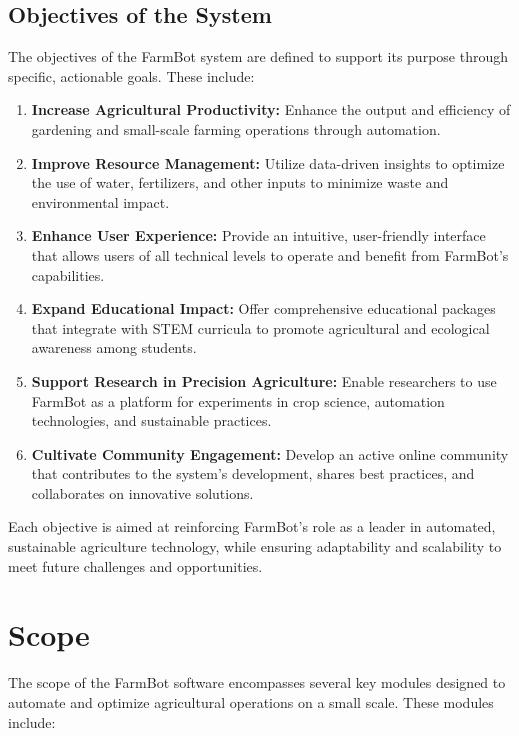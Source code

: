 \subsection{Objectives of the System}
The objectives of the FarmBot system are defined to support its purpose through specific, actionable goals. These include:
\begin{enumerate}
    \item \textbf{Increase Agricultural Productivity:} Enhance the output and efficiency of gardening and small-scale farming operations through automation.
    \item \textbf{Improve Resource Management:} Utilize data-driven insights to optimize the use of water, fertilizers, and other inputs to minimize waste and environmental impact.
    \item \textbf{Enhance User Experience:} Provide an intuitive, user-friendly interface that allows users of all technical levels to operate and benefit from FarmBot's capabilities.
    \item \textbf{Expand Educational Impact:} Offer comprehensive educational packages that integrate with STEM curricula to promote agricultural and ecological awareness among students.
    \item \textbf{Support Research in Precision Agriculture:} Enable researchers to use FarmBot as a platform for experiments in crop science, automation technologies, and sustainable practices.
    \item \textbf{Cultivate Community Engagement:} Develop an active online community that contributes to the system’s development, shares best practices, and collaborates on innovative solutions.
\end{enumerate}
Each objective is aimed at reinforcing FarmBot’s role as a leader in automated, sustainable agriculture technology, while ensuring adaptability and scalability to meet future challenges and opportunities.


\section{Scope}

The scope of the FarmBot software encompasses several key modules designed to automate and optimize agricultural operations on a small scale. These modules include:

